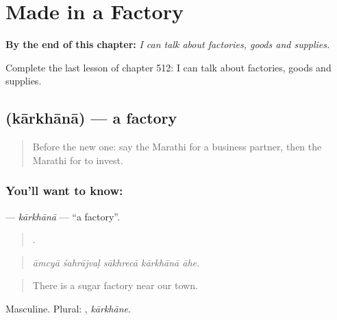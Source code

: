 
\chapter{Made in a Factory}
\label{ch:mr-made-in-a-factory}

\begin{chapteropening}
\textbf{By the end of this chapter:} \emph{I can talk about factories, goods and supplies.}

Complete the last lesson of chapter 512: I can talk about factories, goods and supplies.
\end{chapteropening}

\section[\texorpdfstring{\mr{कारखाना} (kārkhānā)}{कारखाना (kārkhānā)}]{ (kārkhānā) — a factory}

\label{lesson:MR-C512-karkhana}



\begin{quote}
Before the new one: say the Marathi for a business partner, then the Marathi for to invest.
\end{quote}

\subsection*{You'll want to know: }
\textbf{} — \emph{kārkhānā} — \textquotedblleft{}a factory\textquotedblright{}.

\begin{quote}
    .
\end{quote}

\begin{quote}
\emph{āmcyā śahrājvaḷ sākhrecā kārkhānā āhe.}
\end{quote}

\begin{quote}
There is a sugar factory near our town.
\end{quote}

Masculine. Plural: , \emph{kārkhāne}.

